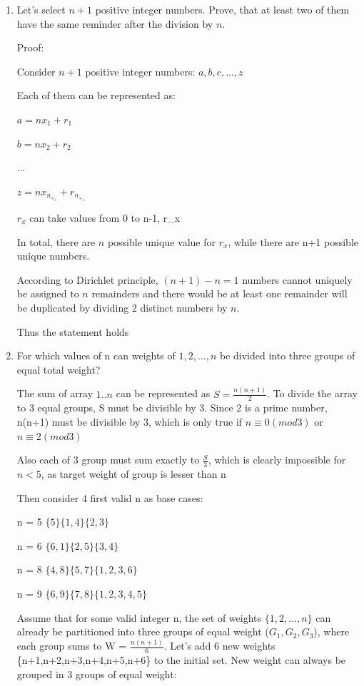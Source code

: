 \documentclass[12pt]{article}
\begin{document}
\begin{enumerate}
    \item Let’s select $n + 1$ positive integer numbers. Prove, that at least two of them
have the same reminder after the division by $n$.

    Proof:

    Consider $n+1$ positive integer numbers: $a, b, c, ... , z$

    Each of them can be represented as:

    $a = nx_1 + r_1$
    
    $b = nx_2 + r_2$ 
    
    ...
    
    $z = nx_n_+_1 + r_n_+_1$


    $r_x$ can take values from 0 to n-1, r_x \in {}
    
    In total, there are $n$ possible unique value for $r_x$, while there are n+1 possible unique numbers.

    According to Dirichlet principle, $(n+1) - n = 1$ numbers cannot uniquely be assigned to $n$ remainders and there would be at least one remainder will be duplicated by dividing 2 distinct numbers by $n$. 
    
    Thus the statement holds



    \item For which values of n can weights of $1, 2, . . . , n$ be divided into three groups of equal total weight?

    The sum of array $1..n$ can be represented as $S = \frac{n(n+1)}{2}$. To divide the array to 3 equal groups, S must be divisible by 3. Since 2 is a prime number, n(n+1) must be divisible by 3, which is only true if $n \equiv 0 (mod 3)$ or $n \equiv 2 (mod 3)$

    Also each of 3 group must sum exactly to $\frac{S}{3}$, which is clearly impossible for $n < 5$, as target weight of group is lesser than n

    Then consider 4 first valid n as base cases:

    n = 5 \implies $\{5\}\{1,4\}\{2,3\}$
    
    n = 6 \implies $\{6,1\}\{2,5\}\{3,4\}$

    n = 8 \implies $\{4,8\}\{5,7\}\{1,2,3,6\}$

    n = 9 \implies $\{6,9\}\{7,8\}\{1,2,3,4,5\}$

    Assume that for some valid integer n, the set of weights \(\{1, 2, \dots, n\}\) can already be partitioned into three groups of equal weight (\(G_1, G_2, G_3\)), where each group sums to W = $\frac{n(n+1)}{6}$. Let's add 6 new weights \{n+1,\;n+2,\;n+3,\;n+4,\;n+5,\;n+6\} to the initial set. New weight can always be grouped in 3 groups of equal weight:


\end{enumerate}
\end{document}
